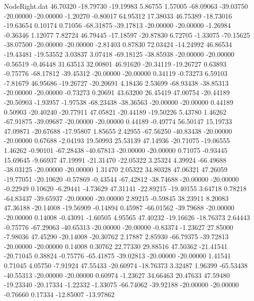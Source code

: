 \begin{filecontents}{NodeRight.dat}
  46.70320  -18.79730  -19.19983     5.86755    1.57005  -68.09063  -39.03750  -20.00000  -20.00000   -1.20270   -0.80017   64.95312   17.38033
  46.75389  -18.73016  -19.63654     0.10174    0.71056  -68.31875  -39.17813  -20.00000  -20.00000   -1.26984   -0.36346    1.12077    7.82724
  46.79445  -17.18597  -20.87830     6.72705   -1.33075  -70.15625  -38.07500  -20.00000  -20.00000   -2.81403    0.87830   72.03424  -14.24992
  46.86534  -19.43481  -19.53552     3.03837    3.07418  -69.18125  -38.85938  -20.00000  -20.00000   -0.56519   -0.46448   31.63513   32.00801
  46.91620  -20.34119  -19.26727     0.63893   -0.75776  -68.17812  -39.45312  -20.00000  -20.00000    0.34119   -0.73273    6.59103   -7.81679
  46.95686  -19.26727  -20.20691     4.18436    2.53699  -68.93438  -38.85313  -20.00000  -20.00000   -0.73273    0.20691   43.63200   26.45419
  47.00754  -20.44189  -20.50903    -1.93957   -1.97538  -68.23438  -38.36563  -20.00000  -20.00000    0.44189    0.50903  -20.40240  -20.77911
  47.05821  -20.44189  -19.50226     5.43780    1.46262  -67.91875  -39.09687  -20.00000  -20.00000    0.44189   -0.49774   56.50147   15.19733
  47.09871  -20.67688  -17.95807     1.85655    2.42955  -67.56250  -40.83438  -20.00000  -20.00000    0.67688   -2.04193   19.50993   25.53139
  47.14936  -20.71075  -19.06555     1.46262   -0.90101  -67.28438  -40.67813  -20.00000  -20.00000    0.71075   -0.93445   15.69645   -9.66937
  47.19991  -21.31470  -22.05322     3.25324    4.39924  -66.49688  -38.03125  -20.00000  -20.00000    1.31470    2.05322   34.80328   47.06321
  47.26059  -19.77051  -20.10620    -0.57869   -0.43544  -67.42812  -38.74688  -20.00000  -20.00000   -0.22949    0.10620   -6.29441   -4.73629
  47.31141  -22.89215  -19.40155     3.64718    0.78218  -64.83437  -39.65937  -20.00000  -20.00000    2.89215   -0.59845   38.23911    8.20083
  47.36188  -20.14008  -19.56909    -0.14894    0.45987  -66.01562  -39.79688  -20.00000  -20.00000    0.14008   -0.43091   -1.60505    4.95565
  47.40232  -19.16626  -18.76373     2.64443   -0.75776  -67.29063  -40.65313  -20.00000  -20.00000   -0.83374   -1.23627   27.85000   -7.98036
  47.45290  -20.14008  -20.30762     2.17887    2.85930  -66.79375  -39.72813  -20.00000  -20.00000    0.14008    0.30762   22.77330   29.88516
  47.50362  -21.41541  -20.71045     0.38824   -0.75776  -65.41875  -39.02813  -20.00000  -20.00000    1.41541    0.71045    4.05750   -7.91924
  47.55433  -20.60974  -18.76373     3.32487    1.96399  -65.53438  -40.55313  -20.00000  -20.00000    0.60974   -1.23627   34.66463   20.47633
  47.59480  -19.23340  -20.17334    -1.22332   -1.33075  -66.74062  -39.92188  -20.00000  -20.00000   -0.76660    0.17334  -12.85007  -13.97862

\end{filecontents}
